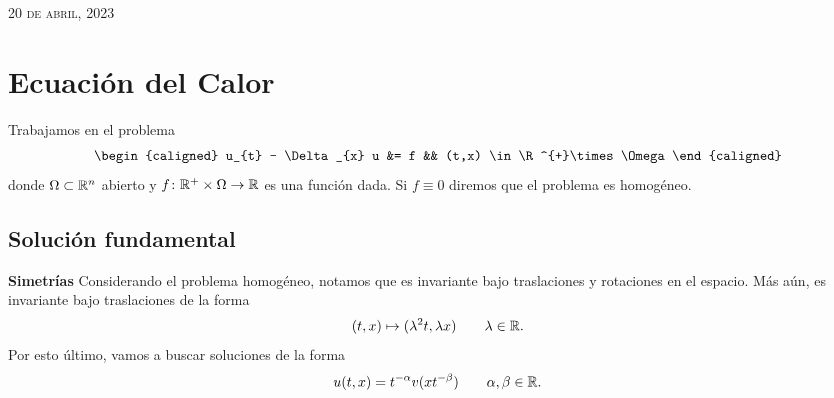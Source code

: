 \documentclass[../edp.tex]{subfiles}
\begin{document}
{\scshape \hfill 20 de abril, 2023}

\section{Ecuación del Calor}
 
Trabajamos en el problema
\begin{equation}\label{eq:calor}
\begin{caligned}
	u_{t} - \Delta_{x} u &= f && (t,x) \in \R^{+}\times \Omega
\end{caligned}
\end{equation}
donde \(\Omega\subset\mathbb{R}^n\) abierto y \(f\colon \mathbb{R}^{+}\times\Omega\to
\mathbb{R}\) es una función dada. Si \(f\equiv 0\) diremos que el problema es
homogéneo.

\subsection{Solución fundamental}

\textbf{Simetrías} Considerando el problema homogéneo, notamos que es
invariante bajo traslaciones y rotaciones en el espacio. Más aún, es
invariante bajo traslaciones de la forma 
\begin{displaymath}
	(t,x) \mapsto (\lambda^2 t, \lambda x)
	\qquad
	\lambda \in \mathbb{R}.
\end{displaymath}
Por esto último, vamos a buscar soluciones de la forma
\begin{equation}\label{separable:calor}
	u(t,x) = t^{-\alpha} v(x t^{-\beta})
	\qquad
	\alpha, \beta \in \mathbb{R}.
\end{equation}
\end{document}

